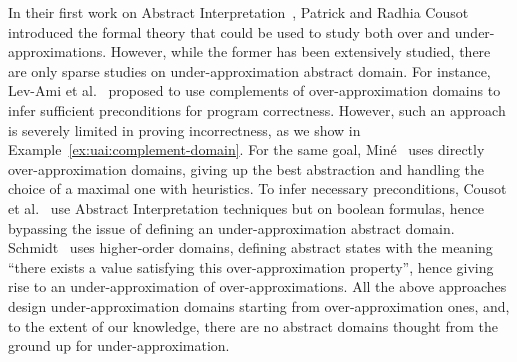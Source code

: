 In their first work on Abstract Interpretation~\cite{CC77}, Patrick and Radhia Cousot introduced the formal theory that could be used to study both over and under-approximations.
However, while the former has been extensively studied, there are only sparse studies on under-approximation abstract domain.
For instance, Lev-Ami et al.~\cite{LSRG07} proposed to use complements of over-approximation domains to infer sufficient preconditions for program correctness. However, such an approach is severely limited in proving incorrectness, as we show in Example~\ref{ex:uai:complement-domain}.
For the same goal, Miné~\cite{Mine14} uses directly over-approximation domains, giving up the best abstraction and handling the choice of a maximal one with heuristics.
To infer necessary preconditions, Cousot et al.~\cite{CCL11,CCFL13} use Abstract Interpretation techniques but on boolean formulas, hence bypassing the issue of defining an under-approximation abstract domain.
Schmidt~\cite{Schmidt07} uses higher-order domains, defining abstract states with the meaning ``there exists a value satisfying this over-approximation property'', hence giving rise to an under-approximation of over-approximations.
All the above approaches design under-approximation domains starting from over-approximation ones, and, to the extent of our knowledge, there are no abstract domains thought from the ground up for under-approximation.


